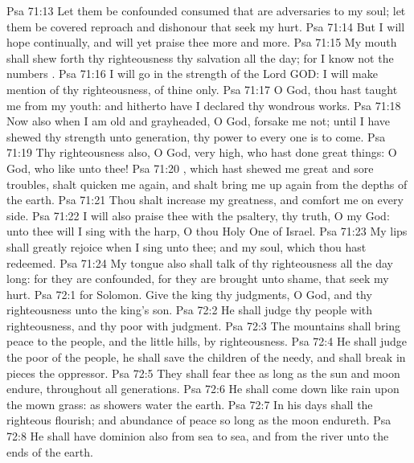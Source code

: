 \vs Psa 71:13 Let them be confounded  consumed that are adversaries to my soul; let them be covered  reproach and dishonour that seek my hurt.
\vs Psa 71:14 But I will hope continually, and will yet praise thee more and more.
\vs Psa 71:15 My mouth shall shew forth thy righteousness  thy salvation all the day; for I know not the numbers .
\vs Psa 71:16 I will go in the strength of the Lord GOD: I will make mention of thy righteousness,  of thine only.
\vs Psa 71:17 O God, thou hast taught me from my youth: and hitherto have I declared thy wondrous works.
\vs Psa 71:18 Now also when I am old and grayheaded, O God, forsake me not; until I have shewed thy strength unto  generation,  thy power to every one  is to come.
\vs Psa 71:19 Thy righteousness also, O God,  very high, who hast done great things: O God, who  like unto thee!
\vs Psa 71:20 , which hast shewed me great and sore troubles, shalt quicken me again, and shalt bring me up again from the depths of the earth.
\vs Psa 71:21 Thou shalt increase my greatness, and comfort me on every side.
\vs Psa 71:22 I will also praise thee with the psaltery,  thy truth, O my God: unto thee will I sing with the harp, O thou Holy One of Israel.
\vs Psa 71:23 My lips shall greatly rejoice when I sing unto thee; and my soul, which thou hast redeemed.
\vs Psa 71:24 My tongue also shall talk of thy righteousness all the day long: for they are confounded, for they are brought unto shame, that seek my hurt.
\vs Psa 72:1  for Solomon. Give the king thy judgments, O God, and thy righteousness unto the king's son.
\vs Psa 72:2 He shall judge thy people with righteousness, and thy poor with judgment.
\vs Psa 72:3 The mountains shall bring peace to the people, and the little hills, by righteousness.
\vs Psa 72:4 He shall judge the poor of the people, he shall save the children of the needy, and shall break in pieces the oppressor.
\vs Psa 72:5 They shall fear thee as long as the sun and moon endure, throughout all generations.
\vs Psa 72:6 He shall come down like rain upon the mown grass: as showers  water the earth.
\vs Psa 72:7 In his days shall the righteous flourish; and abundance of peace so long as the moon endureth.
\vs Psa 72:8 He shall have dominion also from sea to sea, and from the river unto the ends of the earth.
